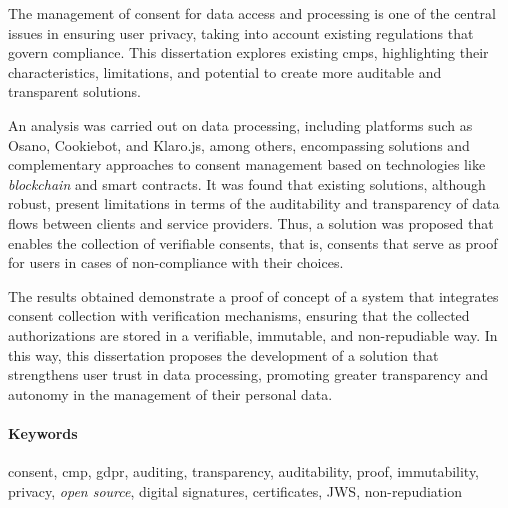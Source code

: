 The management of consent for data access and processing is one of the central issues in ensuring user privacy, taking into account existing regulations that govern compliance. This dissertation explores existing \acrfull{cmp}s, highlighting their characteristics, limitations, and potential to create more auditable and transparent solutions. 

An analysis was carried out on data processing, including platforms such as Osano, Cookiebot, and Klaro.js, among others, encompassing solutions and complementary approaches to consent management based on technologies like \textit{blockchain} and smart contracts. It was found that existing solutions, although robust, present limitations in terms of the auditability and transparency of data flows between clients and service providers. Thus, a solution was proposed that enables the collection of verifiable consents, that is, consents that serve as proof for users in cases of non-compliance with their choices. 

The results obtained demonstrate a proof of concept of a system that integrates consent collection with verification mechanisms, ensuring that the collected authorizations are stored in a verifiable, immutable, and non-repudiable way. In this way, this dissertation proposes the development of a solution that strengthens user trust in data processing, promoting greater transparency and autonomy in the management of their personal data.

\paragraph{Keywords} consent, \acrshort{cmp}, \acrshort{gdpr}, auditing, transparency, auditability, proof, immutability, privacy, \textit{open source}, digital signatures, certificates, JWS, non-repudiation

\cleardoublepage
